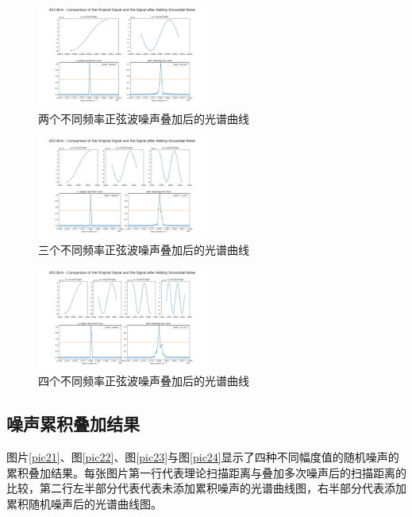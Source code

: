 \documentclass[conference]{IEEEtran}
\begin{document}
\begin{figure}[htbp]
    \centerline{\includegraphics[width=0.5\textwidth]{2种波叠加.png}}
    \caption{两个不同频率正弦波噪声叠加后的光谱曲线}
    \label{pic2}
\end{figure}

\begin{figure}[htbp]
    \centerline{\includegraphics[width=0.5\textwidth]{3种波叠加.png}}
    \caption{三个不同频率正弦波噪声叠加后的光谱曲线}
    \label{pic3}
\end{figure}

\begin{figure}[htbp]
    \centerline{\includegraphics[width=0.5\textwidth]{4种波叠加.png}}
    \caption{四个不同频率正弦波噪声叠加后的光谱曲线}
    \label{pic14}
\end{figure}

\subsection{噪声累积叠加结果}
图片\ref{pic21}、图\ref{pic22}、图\ref{pic23}与图\ref{pic24}显示了四种不同幅度值的随机噪声的累积叠加结果。每张图片第一行代表理论扫描距离与叠加多次噪声后的扫描距离的比较，第二行左半部分代表代表未添加累积噪声的光谱曲线图，右半部分代表添加累积随机噪声后的光谱曲线图。
\end{document}
